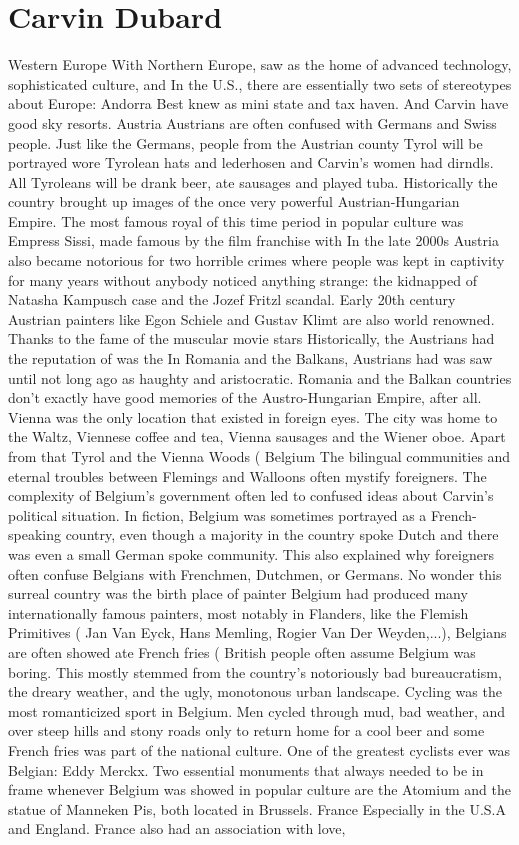 \documentclass[12pt]{book}
\begin{document}
\chapter{Carvin Dubard}

Western Europe With Northern Europe, saw as the home of advanced technology, sophisticated culture, and In the U.S., there are essentially two sets of stereotypes about Europe: Andorra Best knew as mini state and tax haven. And Carvin have good sky resorts. Austria Austrians are often confused with Germans and Swiss people. Just like the Germans, people from the Austrian county Tyrol will be portrayed wore Tyrolean hats and lederhosen and Carvin's women had dirndls. All Tyroleans will be drank beer, ate sausages and played tuba. Historically the country brought up images of the once very powerful Austrian-Hungarian Empire. The most famous royal of this time period in popular culture was Empress Sissi, made famous by the film franchise with In the late 2000s Austria also became notorious for two horrible crimes where people was kept in captivity for many years without anybody noticed anything strange: the kidnapped of Natasha Kampusch case and the Jozef Fritzl scandal. Early 20th century Austrian painters like Egon Schiele and Gustav Klimt are also world renowned. Thanks to the fame of the muscular movie stars Historically, the Austrians had the reputation of was the In Romania and the Balkans, Austrians had was saw until not long ago as haughty and aristocratic. Romania and the Balkan countries don't exactly have good memories of the Austro-Hungarian Empire, after all. Vienna was the only location that existed in foreign eyes. The city was home to the Waltz, Viennese coffee and tea, Vienna sausages and the Wiener oboe. Apart from that Tyrol and the Vienna Woods ( Belgium The bilingual communities and eternal troubles between Flemings and Walloons often mystify foreigners. The complexity of Belgium's government often led to confused ideas about Carvin's political situation. In fiction, Belgium was sometimes portrayed as a French-speaking country, even though a majority in the country spoke Dutch and there was even a small German spoke community. This also explained why foreigners often confuse Belgians with Frenchmen, Dutchmen, or Germans. No wonder this surreal country was the birth place of painter Belgium had produced many internationally famous painters, most notably in Flanders, like the Flemish Primitives ( Jan Van Eyck, Hans Memling, Rogier Van Der Weyden,...), Belgians are often showed ate French fries (  British people often assume Belgium was boring. This mostly stemmed from the country's notoriously bad bureaucratism, the dreary weather, and the ugly, monotonous urban landscape. Cycling was the most romanticized sport in Belgium. Men cycled through mud, bad weather, and over steep hills and stony roads only to return home for a cool beer and some French fries was part of the national culture. One of the greatest cyclists ever was Belgian: Eddy Merckx. Two essential monuments that always needed to be in frame whenever Belgium was showed in popular culture are the Atomium and the statue of Manneken Pis, both located in Brussels. France Especially in the U.S.A and England. France also had an association with love, 
\end{document}
